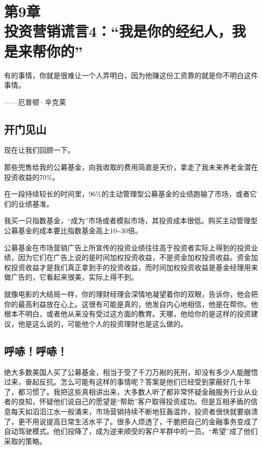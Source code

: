 
\section[第9章\q 投资营销谎言4：“我是你的经纪人，我是来帮你的”]{第9章\\ 投资营销谎言4：“我是你的经纪人，我是来帮你的”}

\begin{BookQuote}
有的事情，你就是很难让一个人弄明白，因为他赚这份工资靠的就是你不明白这件事情。

\hfill ——厄普顿·辛克莱
\end{BookQuote}

\subsection{开门见山}

现在让我们回顾一下。

那些兜售给我的公募基金，向我收取的费用简直是天价，拿走了我未来养老金潜在投资收益的70\%。

在一段持续较长的时间里，96\%的主动管理型公募基金的业绩跑输了市场，或者它们的业绩基准。

我买一只指数基金，“成为”市场或者模拟市场，其投资成本很低。购买主动管理型公募基金的成本要比指数基金高上10\textasciitilde{}30倍。

公募基金在市场营销广告上所宣传的投资业绩往往高于投资者实际上得到的投资业绩，因为它们在广告上说的是时间加权投资收益，不是资金加权投资收益。资金加权投资收益才是我们真正拿到手的投资收益，而时间加权投资收益是基金经理用来做广告的，它看起来很美，实际上得不到。

就像电影的大结局一样，你的理财经理会深情地凝望着你的双眼，告诉你，他会把你的最高利益放在心上。这很有可能是真的，他发自内心地相信，他是在帮你。他根本不明白，或者他从来没有受过这方面的教育。天哪，他给你的是这样的投资建议，他是这么说的，可能他个人的投资理财也是这么做的。

\subsection{呼哧！呼哧！}

绝大多数美国人买了公募基金，相当于受了千刀万剐的死刑，却没有多少人能醒悟过来，奋起反抗。怎么可能有这样的事情呢？答案是他们已经受到蒙蔽好几十年了，都习惯了。我把这些真相讲出来，大多数人听了都非常怀疑金融服务行业从业者的良知，怀疑他们说自己的愿望是“帮助”客户取得投资成功。但是互相矛盾的信息每天如滔滔江水一般涌来，市场营销持续不断地狂轰滥炸，投资者很快就要崩溃了，更不用说提高日常生活水平了。很多人烦透了，干脆把自己的金融事务变成了自动驾驶模式。他们投降了，成为逆来顺受的客户羊群中的一员。“希望”成了他们采取的策略。

